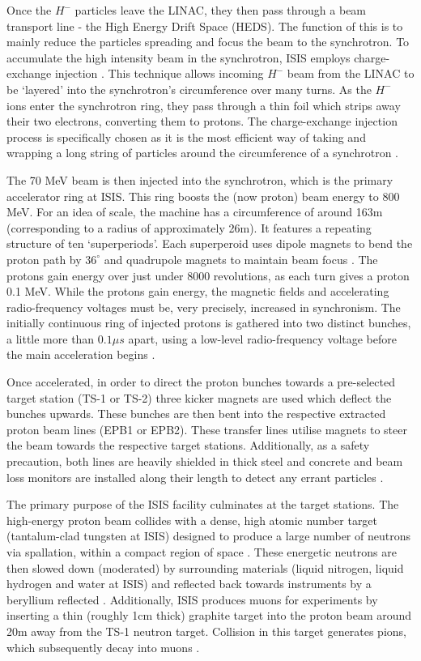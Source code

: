 \documentclass[10pt,oneside]{report}
\begin{document}
Once the $H^-$ particles leave the LINAC, they then pass through a beam transport line - the High Energy Drift Space (HEDS). The function of this is to mainly reduce the particles spreading and focus the beam to the synchrotron. To accumulate the high intensity beam in the synchrotron, ISIS employs charge-exchange injection . This technique allows incoming $H^-$ beam from the LINAC to be `layered' into the synchrotron's circumference over many turns. As the $H^-$ ions enter the synchrotron ring, they pass through a thin foil which strips away their two electrons, converting them to protons. The charge-exchange injection process is specifically chosen as it is the most efficient way of taking and wrapping a long string of particles around the circumference of a synchrotron \cite{2021practicalguide, ankenbrandt1980h}.

The 70 MeV beam is then injected into the synchrotron, which is the primary accelerator ring at ISIS. This ring boosts the (now proton) beam energy to 800 MeV. For an idea of scale, the machine has a circumference of around 163m (corresponding to a radius of approximately 26m). It features a repeating structure of ten `superperiods'. Each superperoid uses dipole magnets to bend the proton path by $36^\circ$ and quadrupole magnets to maintain beam focus \cite{2021practicalguide}. The protons gain energy over just under 8000 revolutions, as each turn gives a proton 0.1 MeV. While the protons gain energy, the magnetic fields and accelerating radio-frequency voltages must be, very precisely, increased in synchronism. The initially continuous ring of injected protons is gathered into two distinct bunches, a little more than $0.1\mu s$ apart, using a low-level radio-frequency voltage before the main acceleration begins \cite{2021practicalguide}.

Once accelerated, in order to direct the proton bunches towards a pre-selected target station (TS-1 or TS-2) three kicker magnets are used which deflect the bunches upwards. These bunches are then bent into the respective extracted proton beam lines (EPB1 or EPB2). These transfer lines utilise magnets to steer the beam towards the respective target stations. Additionally, as a safety precaution, both lines are heavily shielded in thick steel and concrete and beam loss monitors are installed along their length to detect any errant particles \cite{2021practicalguide}.

The primary purpose of the ISIS facility culminates at the target stations. The high-energy proton beam collides with a dense, high atomic number target (tantalum-clad tungsten at ISIS) designed to produce a large number of neutrons via spallation, within a compact region of space \cite{2021practicalguide}. These energetic neutrons are then slowed down (moderated) by surrounding materials (liquid nitrogen, liquid hydrogen and water at ISIS) and reflected back towards instruments by a beryllium reflected \cite{sharma2001nuclear, 2021practicalguide}. Additionally, ISIS produces muons for experiments by inserting a thin (roughly 1cm thick) graphite target into the proton beam around 20m away from the TS-1 neutron target. Collision in this target generates pions, which subsequently decay into muons \cite{2021practicalguide}.
\end{document}
